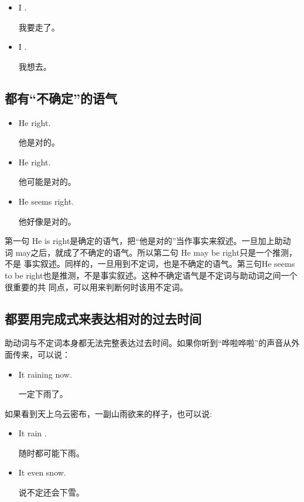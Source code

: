 \begin{itemize}
\item I .

  我要走了。
\item I .

  我想去。
\end{itemize}

\subsection{都有“不确定”的语气}

\begin{itemize}
\item He  right.

  他是对的。
\item He  right.

  他可能是对的。
\item He seems  right.

  他好像是对的。
\end{itemize}

第一句 He is right是确定的语气，把“他是对的”当作事实来叙述。一旦加上助动
词 may之后，就成了不确定的语气。所以第二句 He may be right只是一个推测，不是
事实叙述。同样的，一旦用到不定词，也是不确定的语气。第三句He seems to be
right也是推测，不是事实叙述。这种不确定语气是不定词与助动词之间一个很重要的共
同点，可以用来判断何时该用不定词。

\subsection{都要用完成式来表达相对的过去时间}

助动词与不定词本身都无法完整表达过去时间。如果你听到“哗啦哗啦”的声音从外面传来，可以说：
\begin{itemize}
\item It  raining now.

  一定下雨了。
\end{itemize}

如果看到天上乌云密布，一副山雨欲来的样子，也可以说:
\begin{itemize}
\item It  rain .

  随时都可能下雨。
\item It  even snow.

  说不定还会下雪。
\end{itemize}

